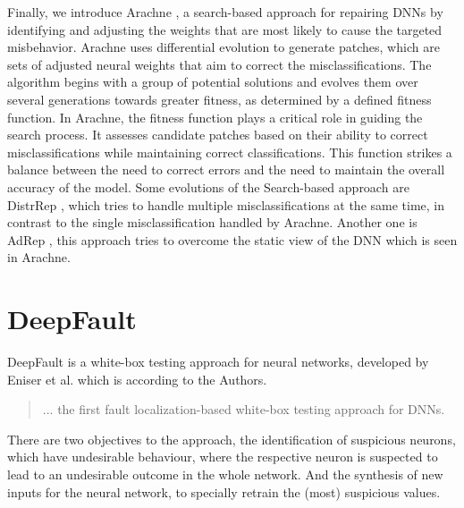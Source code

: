 Finally, we introduce Arachne \cite{sohn_arachne_2023}, a search-based approach for repairing DNNs by identifying and adjusting the weights that are most likely to cause the targeted misbehavior.
Arachne uses differential evolution to generate patches, which are sets of adjusted neural weights that aim to correct the misclassifications.
The algorithm begins with a group of potential solutions and evolves them over several generations towards greater fitness, as determined by a defined fitness function.
In Arachne, the fitness function plays a critical role in guiding the search process.
It assesses candidate patches based on their ability to correct misclassifications while maintaining correct classifications.
This function strikes a balance between the need to correct errors and the need to maintain the overall accuracy of the model.
Some evolutions of the Search-based approach are DistrRep \cite{calsi_distributed_2023}, which tries to handle multiple misclassifications at the same time, in contrast to the single misclassification handled by Arachne.
Another one is AdRep \cite{li_calsi_adaptive_2023}, this approach tries to overcome the static view of the DNN which is seen in Arachne.

\section{DeepFault}\label{sec:deepfault}
DeepFault \cite{eniser_deepfault_2019} is a white-box testing approach for neural networks, developed by Eniser et al. which is according to the Authors.
\begin{quote}
    ... the first fault localization-based white-box testing approach for DNNs.
\end{quote}
There are two objectives to the approach, the identification of suspicious neurons, which have undesirable behaviour, where the respective neuron is suspected to lead to an undesirable outcome in the whole network.
And the synthesis of new inputs for the neural network, to specially retrain the (most) suspicious values.

